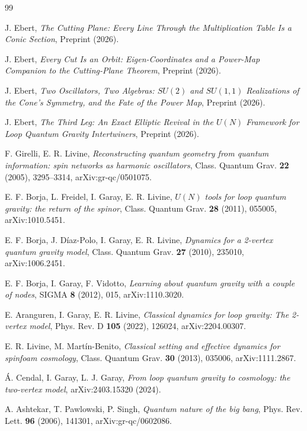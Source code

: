 \documentclass[11pt]{amsart}
\theoremstyle{remark}
\begin{document}
\begin{thebibliography}{99}

 J. Ebert, \emph{The Cutting Plane: Every Line Through the Multiplication Table Is a Conic Section}, Preprint (2026).

 J. Ebert, \emph{Every Cut Is an Orbit: Eigen-Coordinates and a Power-Map Companion to the Cutting-Plane Theorem}, Preprint (2026).

 J. Ebert, \emph{Two Oscillators, Two Algebras: $SU(2)$ and $SU(1,1)$ Realizations of the Cone's Symmetry, and the Fate of the Power Map}, Preprint (2026).

 J. Ebert, \emph{The Third Leg: An Exact Elliptic Revival in the $U(N)$ Framework for Loop Quantum Gravity Intertwiners}, Preprint (2026).

 F. Girelli, E. R. Livine, \emph{Reconstructing quantum geometry from quantum information: spin networks as harmonic oscillators}, Class. Quantum Grav. \textbf{22} (2005), 3295--3314, arXiv:gr-qc/0501075.

 E. F. Borja, L. Freidel, I. Garay, E. R. Livine, \emph{$U(N)$ tools for loop quantum gravity: the return of the spinor}, Class. Quantum Grav. \textbf{28} (2011), 055005, arXiv:1010.5451.

 E. F. Borja, J. D\'iaz-Polo, I. Garay, E. R. Livine, \emph{Dynamics for a 2-vertex quantum gravity model}, Class. Quantum Grav. \textbf{27} (2010), 235010, arXiv:1006.2451.

 E. F. Borja, I. Garay, F. Vidotto, \emph{Learning about quantum gravity with a couple of nodes}, SIGMA \textbf{8} (2012), 015, arXiv:1110.3020.

 E. Aranguren, I. Garay, E. R. Livine, \emph{Classical dynamics for loop gravity: The 2-vertex model}, Phys. Rev. D \textbf{105} (2022), 126024, arXiv:2204.00307.

 E. R. Livine, M. Mart\'in-Benito, \emph{Classical setting and effective dynamics for spinfoam cosmology}, Class. Quantum Grav. \textbf{30} (2013), 035006, arXiv:1111.2867.

 \'A. Cendal, I. Garay, L. J. Garay, \emph{From loop quantum gravity to cosmology: the two-vertex model}, arXiv:2403.15320 (2024).

 A. Ashtekar, T. Pawlowski, P. Singh, \emph{Quantum nature of the big bang}, Phys. Rev. Lett. \textbf{96} (2006), 141301, arXiv:gr-qc/0602086.


\end{thebibliography}
\end{document}
